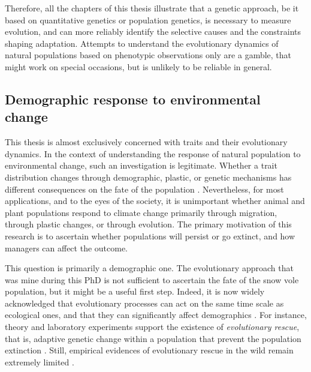 Therefore, all the chapters of this thesis illustrate that a genetic approach, be it based on quantitative genetics or population genetics, is necessary to measure evolution, and can more reliably identify the selective causes and the constraints shaping adaptation. 
Attempts to understand the evolutionary dynamics of natural populations based on phenotypic observations only \parencite[e.g.][]{Smallegange2013} are a gamble, that might work on special occasions, but is unlikely to be reliable in general. 

\subsection{Demographic response to environmental change}
This thesis is almost exclusively concerned with traits and their evolutionary dynamics. 
In the context of understanding the response of natural population to environmental change, such an investigation is legitimate. Whether a trait distribution changes through demographic, plastic, or genetic mechanisms has different consequences on the fate of the population \parencite{Chevin2010}.
Nevertheless, for most applications, and to the eyes of the society, it is unimportant whether animal and plant populations respond to climate change primarily through migration, through plastic changes, or through evolution. The primary motivation of this research is to ascertain whether populations will persist or go extinct, and how managers can affect the outcome.

This question is primarily a demographic one. The evolutionary approach that was mine during this PhD is not sufficient to ascertain the fate of the snow vole population, but it might be a useful first step. Indeed, it is now widely acknowledged that evolutionary processes can act on the same time scale as ecological ones, and that they can significantly affect demographics \parencite{Hairston2005,Ellner2011, Chevin2010a, Turcotte2011}. For instance, theory and laboratory experiments support the existence of \emph{evolutionary rescue}, that is, adaptive genetic change within a population that prevent the population extinction \parencite{Gonzalez2013a, Schiffers2013a}. Still, empirical evidences of evolutionary rescue in the wild remain extremely limited \parencite{Wal2013}.

